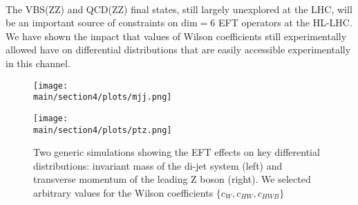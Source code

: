 \\
The VBS(ZZ) and QCD(ZZ) final states, still largely unexplored at the LHC, will be an important source of constraints on $\mathrm{dim=6}$ EFT operators at the HL-LHC. We have shown the impact that values of Wilson coefficients still experimentally allowed have on differential distributions that are easily accessible experimentally in this channel. 

% 
\begin{figure}[htbp]
  \begin{minipage}[b]{0.5\textwidth}
    \texttt{[image: \\main/section4/plots/mjj.png]}
  \end{minipage}
  \begin{minipage}[b]{0.5\textwidth}
    \texttt{[image: \\main/section4/plots/ptz.png]}
  \end{minipage}
  \caption{Two generic simulations showing the EFT effects on key differential distributions: invariant mass of the di-jet system (left) and transverse momentum of the leading Z boson (right). We selected arbitrary values for the Wilson coefficients $\lbrace c_W, c_{HW}, c_{HWB} \rbrace$}
  \label{fig:plots}
\end{figure}


